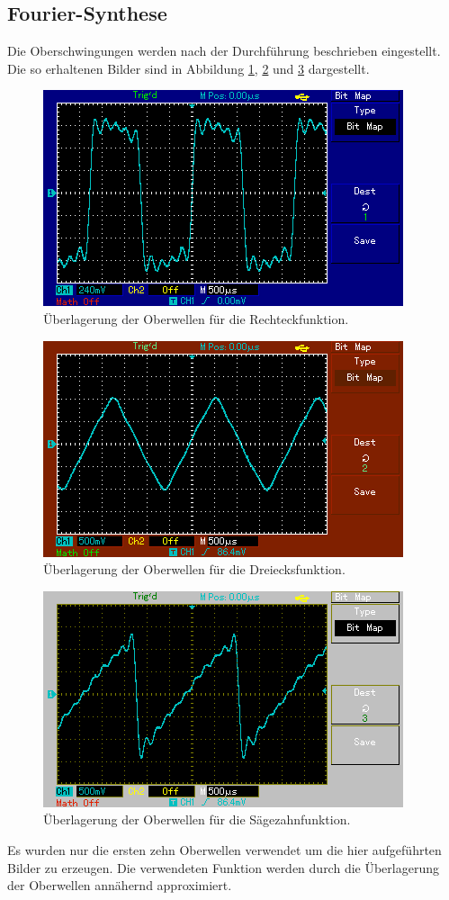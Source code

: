 \subsection{Fourier-Synthese}
Die Oberschwingungen werden nach der Durchführung beschrieben eingestellt.
Die so erhaltenen Bilder sind in Abbildung \ref{fig:eck}, \ref{fig:drei} und \ref{fig:saeg} dargestellt.
\begin{figure}[H]
    \centering
    \caption{Überlagerung der Oberwellen für die Rechteckfunktion.}
    \label{fig:eck}
    \includegraphics{content/MAP001.png}
\end{figure}
\begin{figure}[H]
    \centering
    \caption{Überlagerung der Oberwellen für die Dreiecksfunktion.}
    \label{fig:drei}
    \includegraphics{content/MAP002.png}
\end{figure}
\begin{figure}[H]
    \centering
    \caption{Überlagerung der Oberwellen für die Sägezahnfunktion.}
    \label{fig:saeg}
    \includegraphics{content/MAP003.png}
\end{figure}
\noindent
Es wurden nur die ersten zehn Oberwellen verwendet um die hier aufgeführten Bilder zu erzeugen.
Die verwendeten Funktion werden durch die Überlagerung der Oberwellen annähernd approximiert.
